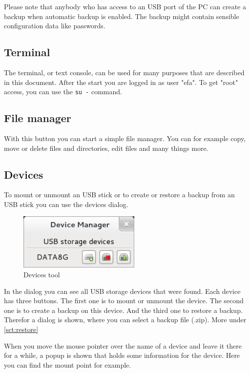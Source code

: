 \documentclass[a4paper,12pt,twoside]{article}
\begin{document}
Please note that anybody who has access to an USB port of the PC can
create a backup when automatic backup is enabled. The backup might
contain sensible configuration data like passwords.


\subsection{Terminal}
\label{sct:terminal}
The terminal, or text console, can be used for many purposes that are
described in this document. After the start you are logged in as user
"efa". To get "root" access, you can use the \texttt{su -} command.


\subsection{File manager}
\label{sct:file_manager}
With this button you can start a simple file manager. You can for
example copy, move or delete files and directories, edit files and many
things more.

\subsection{Devices}
\label{sct:dialog_devices}
To mount or unmount an USB stick or
to create or restore a backup from an USB stick you can use
the devices dialog.

\begin{figure}
    \centering
    \includegraphics[width=6cm]{efaLiveen-img/efaLiveen-img21.png}
    \caption{Devices tool}
    \label{fig:dialog_devices}
\end{figure}

In the dialog you can see all USB storage devices that were found. Each
device has three buttons. The first one is to mount or unmount the
device. The second one is to create a backup on this device. And the
third one to restore a backup. Therefor a dialog is shown, where you
can select a backup file (.zip). More under \ref{sct:restore}

When you move the mouse pointer over the name of a device and leave it
there for a while, a popup is shown that holds some information for the
device. Here you can find the mount point for example.
\end{document}
